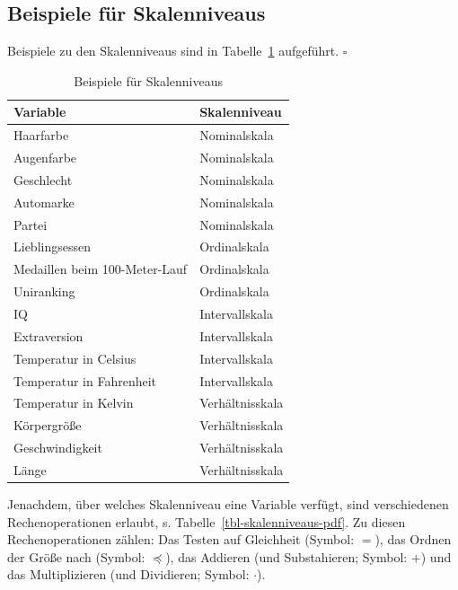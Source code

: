 \documentclass[
  letterpaper,
  twoside,
  open=any]{scrbook}
\theoremstyle{definition}
\theoremstyle{definition}
\theoremstyle{definition}
\theoremstyle{remark}
\begin{document}
\subsection{Beispiele für
Skalenniveaus}\label{beispiele-fuxfcr-skalenniveaus}

Beispiele zu den Skalenniveaus sind in Tabelle~\ref{tbl-skalen-bsps}
aufgeführt. \(\square\)

\begin{longtable}[]{@{}ll@{}}

\caption{\label{tbl-skalen-bsps}Beispiele für Skalenniveaus}

\tabularnewline

\toprule\noalign{}
Variable & Skalenniveau \\
\midrule\noalign{}
\endhead
\bottomrule\noalign{}
\endlastfoot
Haarfarbe & Nominalskala \\
Augenfarbe & Nominalskala \\
Geschlecht & Nominalskala \\
Automarke & Nominalskala \\
Partei & Nominalskala \\
Lieblingsessen & Ordinalskala \\
Medaillen beim 100-Meter-Lauf & Ordinalskala \\
Uniranking & Ordinalskala \\
IQ & Intervallskala \\
Extraversion & Intervallskala \\
Temperatur in Celsius & Intervallskala \\
Temperatur in Fahrenheit & Intervallskala \\
Temperatur in Kelvin & Verhältnisskala \\
Körpergröße & Verhältnisskala \\
Geschwindigkeit & Verhältnisskala \\
Länge & Verhältnisskala \\

\end{longtable}

Jenachdem, über welches Skalenniveau eine Variable verfügt, sind
verschiedenen Rechenoperationen erlaubt, s.
{Tabelle~\ref{tbl-skalenniveaus-pdf}}. Zu diesen Rechenoperationen
zählen: Das Testen auf Gleichheit (Symbol: \(=\)), das Ordnen der Größe
nach (Symbol: \(\preceq\)), das Addieren (und Substahieren; Symbol:
\(+\)) und das Multiplizieren (und Dividieren; Symbol: \(\cdot\)).
\end{document}
